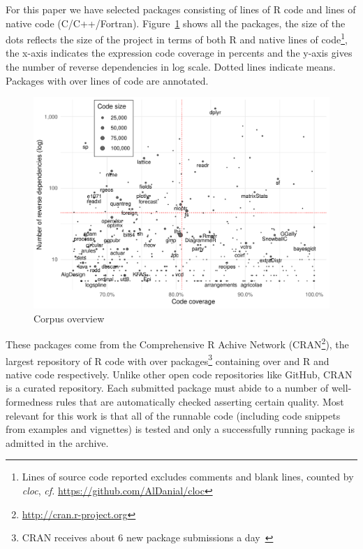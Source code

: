 \documentclass[acmsmall,review,anonymous]{acmart}\settopmatter{printfolios=true,printccs=false,printacmref=false}
\newcommand{\cf}{\emph{cf.}\xspace}
\begin{document}
For this paper we have selected \CorpusLoadable packages consisting of
\CorpusRCodeRnd lines of R code and \CorpusNativeCodeRnd lines of native
code (C/C++/Fortran).   Figure~\ref{fig:corpus} shows
all the packages, the size of the dots reflects the size of the project in
terms of both R and native lines of code\footnote{ Lines of source code
  reported excludes comments and blank lines, counted by \emph{cloc}, \cf
  \url{https://github.com/AlDanial/cloc}}, the x-axis indicates the
expression code coverage in percents and the y-axis gives the number of
reverse dependencies in log scale. Dotted lines indicate means.  Packages
with over \PackageSizeOutierRnd lines of code are annotated.

\begin{figure}[!h]  \centering
  \includegraphics[width=.8\linewidth]{plots/corpus.pdf}
  \caption{Corpus overview}\label{fig:corpus}
\end{figure}

These packages come from the Comprehensive R Achive Network
(CRAN\footnote{\url{http://cran.r-project.org}}), the largest repository of
R code with over \AllCranRnd packages\footnote{CRAN receives about 6 new
  package submissions a day~\cite{Ligges2017}} containing over \AllRCodeRnd
and \AllNativeCodeRnd R and native code respectively. Unlike other open code
repositories like GitHub, CRAN is a curated repository. Each submitted
package must abide to a number of well-formedness rules that are
automatically checked asserting certain quality. Most relevant for this work
is that all of the runnable code (including code snippets from examples and
vignettes) is tested and only a successfully running package is admitted in
the archive.
\end{document}
